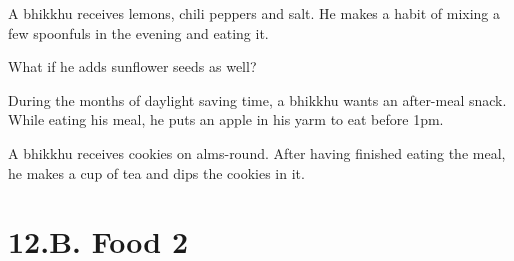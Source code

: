 \bigskip

A bhikkhu receives lemons, chili peppers and salt. He makes a habit of mixing a
few spoonfuls in the evening and eating it.

\bigskip

What if he adds sunflower seeds as well?

\bigskip

During the months of daylight saving time, a bhikkhu wants an after-meal snack.
While eating his meal, he puts an apple in his yarm to eat before 1pm.

\bigskip

A bhikkhu receives cookies on alms-round. After having finished eating the meal, he makes a cup of tea and
dips the cookies in it.

\chapter{12.B. Food 2}
\renewcommand*{\theChapterTitle}{12.B. Food 2}
